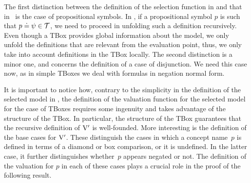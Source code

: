 The first distinction between the definition of the selection function in  and that in~ is the case of propositional symbols. In , if a propositional symbol $p$ is such that $p\doteq\psi \in \mathcal{T}$, we need to proceed in unfolding such a definition recursively. Even though a TBox provides global information about the model, we only unfold the definitions that are relevant from the evaluation point, thus, we only take into  account definitions in the TBox locally. The second distinction is a minor one, and concerns the definition of a case of disjunction. We need this case now, as in simple TBoxes we deal with formulas in negation normal form. 

It is important to notice how, contrary to the simplicity in the definition of the selected model in , the definition of the valuation function for the selected model for the case of TBoxes requires some ingenuity and takes advantage of the structure of the TBox.
In particular, the structure of the TBox guarantees that the recursive definition of $\mathrm{V}'$ is well-founded.
More interesting is the definition of the base cases for $\mathrm{V}'$.
These distinguish the cases in which a concept name~$p$ is defined in terms of a diamond or box comparison, or it is undefined.
In the latter case, it further distinguishes whether~$p$ appears negated or not.
The definition of the valuation for $p$ in each of these cases plays a crucial role in the proof of the following result.

